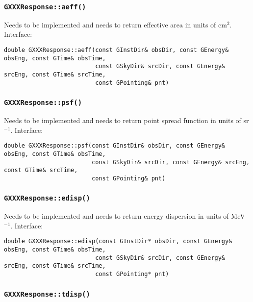 \documentclass{article}[12pt,a4]
\begin{document}
\subsubsection{{\tt GXXXResponse::aeff()}}

Needs to be implemented and needs to return effective area in units of cm$^2$.
Interface:
\begin{verbatim}
double GXXXResponse::aeff(const GInstDir& obsDir, const GEnergy& obsEng, const GTime& obsTime,
                          const GSkyDir& srcDir, const GEnergy& srcEng, const GTime& srcTime,
                          const GPointing& pnt)
\end{verbatim}


\subsubsection{{\tt GXXXResponse::psf()}}

Needs to be implemented and needs to return point spread function in units of sr$^{-1}$.
Interface:
\begin{verbatim}
double GXXXResponse::psf(const GInstDir& obsDir, const GEnergy& obsEng, const GTime& obsTime,
                         const GSkyDir& srcDir, const GEnergy& srcEng, const GTime& srcTime,
                         const GPointing& pnt)
\end{verbatim}


\subsubsection{{\tt GXXXResponse::edisp()}}

Needs to be implemented and needs to return energy dispersion in units of MeV$^{-1}$.
Interface:
\begin{verbatim}
double GXXXResponse::edisp(const GInstDir* obsDir, const GEnergy& obsEng, const GTime& obsTime,
                          const GSkyDir& srcDir, const GEnergy& srcEng, const GTime& srcTime,
                          const GPointing* pnt)
\end{verbatim}


\subsubsection{{\tt GXXXResponse::tdisp()}}
\end{document}
